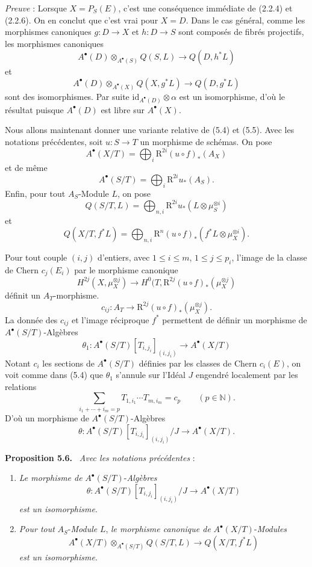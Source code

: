 \documentclass[11pt]{article}
\newenvironment{statement}[1]{\par\medskip\noindent\textbf{#1.}\ }{\par\medskip}
\begin{document}
\emph{Preuve} : Lorsque $X=P_S(E)$, c'est une conséquence immédiate de (2.2.4) et (2.2.6). On en conclut que c'est vrai pour $X=D$. Dans le cas général, comme les morphismes canoniques $g:D\to X$ et $h:D\to S$ sont composés de fibrés projectifs, les morphismes canoniques
\[
A^\bullet(D)\otimes_{A^\bullet(S)}Q(S,L)\to Q(D,h^*L)
\]
et
\[
A^\bullet(D)\otimes_{A^\bullet(X)}Q(X,g^*L)\to Q(D,g^*L)
\]
sont des isomorphismes. Par suite $\mathrm{id}_{A^\bullet(D)}\otimes\alpha$ est un isomorphisme, d'où le résultat puisque $A^\bullet(D)$ est libre sur $A^\bullet(X)$.

Nous allons maintenant donner une variante relative de (5.4) et (5.5). Avec les notations précédentes, soit $u:S\to T$ un morphisme de schémas. On pose
\[
A^\bullet(X/T)=\bigoplus_i \mathrm{R}^{2i}(u\circ f)_*(A_X)
\]
et de même
\[
A^\bullet(S/T)=\bigoplus_i \mathrm{R}^{2i}u_*(A_S).
\]
Enfin, pour tout $A_S$-Module $L$, on pose
\[
Q(S/T,L)=\bigoplus_{n,i}\mathrm{R}^{2i} u_*(L\otimes\mu_S^{\otimes i})
\]
et
\[
Q(X/T,f^*L)=\bigoplus_{n,i}\mathrm{R}^n(u\circ f)_*(f^*L\otimes\mu_X^{\otimes i}).
\]

Pour tout couple $(i,j)$ d'entiers, avec $1\le i\le m$, $1\le j\le p_i$, l'image de la classe de Chern $c_j(E_i)$ par le morphisme canonique
\[
H^{2j}(X,\mu_X^{\otimes j})
\to H^0(T,\mathrm{R}^{2j}(u\circ f)_*(\mu_X^{\otimes j})
\]
définit un $A_T$-morphisme.
\[
c_{ij}:A_T\to \mathrm{R}^{2j}(u\circ f)_*(\mu_X^{\otimes j}).
\]
La donnée des $c_{ij}$ et l'image réciproque $f^*$ permettent de définir un morphisme de $A^\bullet(S/T)$-Algèbres
\[
\theta_1:A^\bullet(S/T)[T_{i,j_i}]_{(i,j_i)}\to A^\bullet(X/T)
\]
Notant $c_i$ les sections de $A^\bullet(S/T)$ définies par les classes de Chern $c_i(E)$, on voit comme dans (5.4) que $\theta_1$ s'annule sur l'Idéal $J$ engendré localement par les relations
\[
\sum_{i_1+\cdots+i_m=p}T_{1,i_1}\cdots T_{m,i_m}=c_p\qquad(p\in\mathbb N).
\]
D'où un morphisme de $A^\bullet(S/T)$-Algèbres
\[
\theta:A^\bullet(S/T)[T_{i,j_i}]_{(i,j_i)}/J\to A^\bullet(X/T).
\]

\begin{statement}{Proposition 5.6}
\emph{Avec les notations précédentes} :
\begin{enumerate}[label=\alph*)]
\item \emph{Le morphisme de} $A^\bullet(S/T)$-\emph{Algèbres}
\[
\theta:A^\bullet(S/T)[T_{i,j_i}]_{(i,j_i)}/J\to A^\bullet(X/T)
\]
\emph{est un isomorphisme}.
\item \emph{Pour tout} $A_S$-\emph{Module} $L$, \emph{le morphisme canonique de} $A^\bullet(X/T)$-\emph{Modules}
\[
A^\bullet(X/T)\otimes_{A^\bullet(S/T)}Q(S/T,L)\to Q(X/T,f^*L)
\]
\emph{est un isomorphisme}.
\end{enumerate}
\end{statement}
\end{document}
